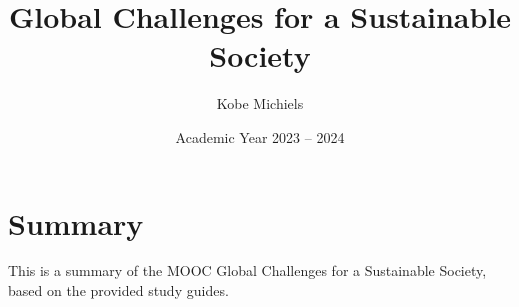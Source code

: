 \documentclass[kul]{kulakarticle} %
\title{Global Challenges for a Sustainable Society}
\author{Kobe Michiels}
\date{Academic Year 2023 -- 2024}
\begin{document}
\maketitle

\section*{Summary}

This is a summary of the MOOC Global Challenges for a Sustainable Society, based on the provided study guides.














\end{document}
